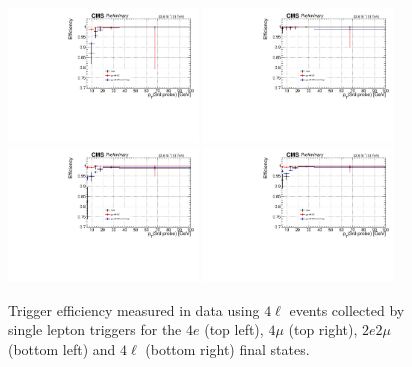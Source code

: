 \begin{figure}[!htb]
\vspace*{0.3cm}
\begin{center}
\includegraphics[width=0.45\textwidth]{Figures/Trigger/Histo_TrigEff_ptMin_4e.pdf} 
\includegraphics[width=0.45\textwidth]{Figures/Trigger/Histo_TrigEff_ptMin_4mu.pdf} \\
\includegraphics[width=0.45\textwidth]{Figures/Trigger/Histo_TrigEff_ptMin_2e2mu.pdf} 
\includegraphics[width=0.45\textwidth]{Figures/Trigger/Histo_TrigEff_ptMin_4l.pdf} \\
\caption{Trigger efficiency measured in data using $4\ell$ events collected by single lepton triggers for the $4e$ (top left), $4\mu$ (top right), $2e2\mu$ (bottom left) and $4\ell$ (bottom right) final states. 
\label{fig:TrigEff}}
\end{center}
\end{figure}

